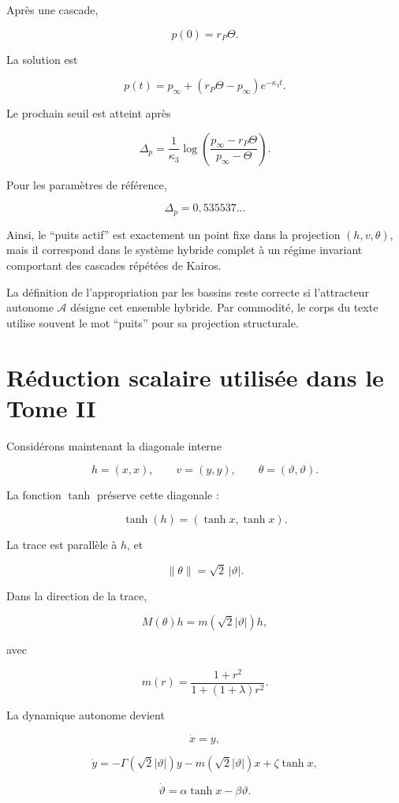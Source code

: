Après une cascade,

\[
p(0)=r_P\Theta.
\]

La solution est

\[
p(t)
=
p_\infty
+
\left(
r_P\Theta-p_\infty
\right)e^{-\kappa_3t}.
\]

Le prochain seuil est atteint après

\[
\boxed{
\Delta_p
=
\frac{1}{\kappa_3}
\log
\left(
\frac{p_\infty-r_P\Theta}
{p_\infty-\Theta}
\right).
}
\]

Pour les paramètres de référence,

\[
\Delta_p
=
0{,}535537\ldots
\]

Ainsi, le ``puits actif'' est exactement un point fixe dans la
projection \((h,v,\theta)\), mais il correspond dans le système
hybride complet à un régime invariant comportant des cascades
répétées de Kairos.

La définition de l'appropriation par les bassins reste correcte si
l'attracteur autonome \(\mathcal A\) désigne cet ensemble hybride.
Par commodité, le corps du texte utilise souvent le mot ``puits'' pour
sa projection structurale.

\section{Réduction scalaire utilisée dans le Tome II}
\label{annexe-reduction-scalaire-tome-ii}

Considérons maintenant la diagonale interne

\[
h=(x,x),
\qquad
v=(y,y),
\qquad
\theta=(\vartheta,\vartheta).
\]

La fonction \(\tanh\) préserve cette diagonale :

\[
\tanh(h)
=
(\tanh x,\tanh x).
\]

La trace est parallèle à \(h\), et

\[
\|\theta\|
=
\sqrt2\,|\vartheta|.
\]

Dans la direction de la trace,

\[
M(\theta)h
=
m(\sqrt2|\vartheta|)h,
\]

avec

\[
m(r)
=
\frac{1+r^2}
{1+(1+\lambda)r^2}.
\]

La dynamique autonome devient

\[
\dot x=y,
\]

\[
\dot y
=
-\Gamma(\sqrt2|\vartheta|)y
-
m(\sqrt2|\vartheta|)x
+
\zeta\tanh x,
\]

\[
\dot\vartheta
=
\alpha\tanh x-\beta\vartheta.
\]

